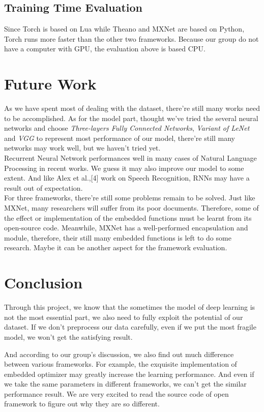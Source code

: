 \documentclass[12pt]{article}
\begin{document}
\subsection{Training Time Evaluation}
Since Torch is based on Lua while Theano and MXNet are based on Python, Torch runs more faster than the other two frameworks. Because our group do not have a computer with GPU, the evaluation above is based CPU.
	
\section{Future Work}
As we have spent most of dealing with the dataset, there're still many works need to be accomplished.
As for the model part, thought we've tried the several neural networks and choose {\it Three-layers Fully Connected Networks}, {\it Variant of LeNet} and {\it VGG} to represent most performance of our model, there're still many networks may work well, but we haven't tried yet.\\
Recurrent Neural Network performances well in many cases of Natural Language Processing in recent works. We guess it may also improve our model to some extent. And like Alex et al.,[4] work on Speech Recognition, RNNs may have a result out of expectation.\\
For three frameworks, there're still some problems remain to be solved. Just like MXNet, many researchers will suffer from its poor documents. Therefore, some of the effect or implementation of the embedded functions must be learnt from its open-source code. Meanwhile, MXNet has a well-performed encapsulation and module, therefore, their still many embedded functions is left to do some research. Maybe it can be another aspect for the framework evaluation.\\


\section{Conclusion}
Through this project, we know that the sometimes the model of deep learning is not the most essential part, we also need to fully exploit the potential of our dataset. If we don’t preprocess our data carefully, even if we put the most fragile model, we won’t get the satisfying result. 

And according to our group’s discussion, we also find out much difference between various frameworks. For example, the exquisite implementation of embedded optimizer may greatly increase the learning performance. And even if we take the same parameters in different frameworks, we can’t get the similar performance result. We are very excited to read the source code of open framework to figure out why they are so different. 
\end{document}
